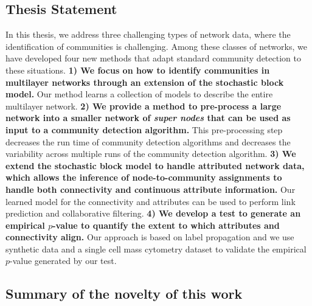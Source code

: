 \subsection{Thesis Statement}
In this thesis, we address three challenging types of network data,  where the identification of communities is challenging. Among these classes of networks, we have developed four new methods that adapt standard community detection to these situations. {\bf 1) We focus on how to identify communities in multilayer networks through an extension of the stochastic block model.} Our method learns a collection of models to describe the entire multilayer network. {\bf 2) We provide a method to pre-process a large network into a smaller network of \emph{super nodes} that can be used as input to a community detection algorithm.} This pre-processing step decreases the run time of community detection algorithms and decreases the variability across multiple runs of the community detection algorithm. {\bf 3) We extend the stochastic block model to handle attributed network data, which allows the inference of node-to-community assignments to handle both connectivity and continuous attribute information.} Our learned model for the connectivity and attributes can be used to perform link prediction and collaborative filtering.  {\bf 4) We develop a test to generate an empirical $p$-value to quantify the extent to which attributes and connectivity align.} Our approach is based on label propagation and we use synthetic data and a single cell mass cytometry dataset to validate the empirical $p$-value generated by our test.

\subsection{Summary of the novelty of this work}

